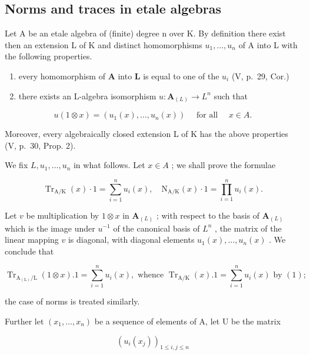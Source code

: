 \subsection{Norms and traces in etale algebras}

Let A be an etale algebra of (finite) degree n over K. By definition there exist then an extension L of K and distinct homomorphisms \(u_{1}, \ldots, u_{n}\) of A into L with the following properties.

\begin{enumerate}
\def\labelenumi{\alph{enumi})}
\item
  every homomorphism of \(\mathbf{A}\) into \(\mathbf{L}\) is equal to one of the \(u_{i}\) (V, p.~29, Cor.)
\item
  there exists an L-algebra isomorphism \(u: \mathbf{A}_{(L)} \to L^n\) such that
\end{enumerate}

\[
u (1 \otimes x) = \left(u _ {1} (x), \dots , u _ {n} (x)\right) \quad \text { for   all } \quad x \in A.
\]

Moreover, every algebraically closed extension L of K has the above properties (V, p.~30, Prop. 2).

We fix \(L, u_1, \ldots, u_n\) in what follows. Let \(x \in A\) ; we shall prove the formulae

\[
\operatorname{Tr} _ {\mathrm{A} / \mathrm{K}} (x) \cdot 1 = \sum_ {i = 1} ^ {n} u _ {i} (x), \quad \mathrm{N} _ {\mathrm{A} / \mathrm{K}} (x) \cdot 1 = \prod_ {i = 1} ^ {n} u _ {i} (x).\tag{3}
\]

Let \(v\) be multiplication by \(1 \otimes x\) in \(\mathbf{A}_{(L)}\) ; with respect to the basis of \(\mathbf{A}_{(L)}\) which is the image under \(u^{-1}\) of the canonical basis of \(L^n\) , the matrix of the linear mapping \(v\) is diagonal, with diagonal elements \(u_1(x), \ldots, u_n(x)\) . We conclude that

\[
\operatorname{Tr} _ {\mathrm{A} _ {(\mathrm{L})} / \mathrm{L}} (1 \otimes x). 1 = \sum_ {i = 1} ^ {n} u _ {i} (x), \text { whence } \operatorname{Tr} _ {\mathrm{A} / \mathrm{K}} (x). 1 = \sum_ {i = 1} ^ {n} u _ {i} (x) \text { by } (1);
\]

the case of norms is treated similarly.

Further let \((x_{1},\ldots ,x_{n})\) be a sequence of elements of A, let U be the matrix

\[
\left(u _ {i} \left(x _ {j}\right)\right) _ {1 \leqslant i, j \leqslant n}
\]

